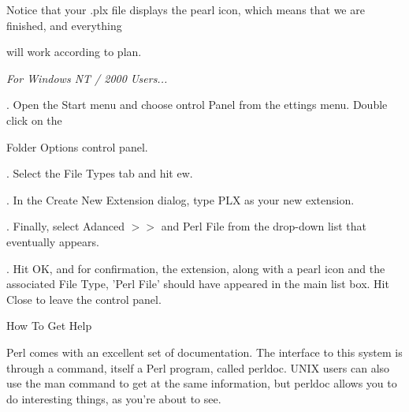 \documentclass[a4paper,11pt]{book}
\begin{document}
\noindent 

\noindent 

\noindent 

\noindent 

\noindent 

\noindent 

\noindent 

\noindent 

\noindent 

\noindent 

\noindent Notice that your .plx file displays the pearl icon, which means that we are finished, and everything

\noindent will work according to plan.

\noindent 

\noindent \textit{For Windows NT / 2000 Users...}

.   Open the Start menu and choose ontrol Panel from the ettings menu. Double click on the

\noindent Folder Options control panel.

\noindent 

.   Select the File Types tab and hit ew.

\noindent 

.   In the Create New Extension dialog, type PLX as your new extension.

\noindent 

.   Finally, select Adanced $>$$>$ and Perl File from the drop-down list that eventually appears.

\noindent 

.   Hit  OK,  and for  confirmation,  the  extension,  along  with  a  pearl  icon  and the  associated File Type,  'Perl File'  should have  appeared  in  the  main  list  box.  Hit  Close to  leave  the control panel.

\noindent 

\noindent How To Get Help

\noindent 

\noindent Perl comes with an excellent set of documentation. The interface to this system is through a command, itself a Perl program, called perldoc. UNIX users can also use the man command to get at the same information, but perldoc allows you to do interesting things, as you're about to see.

\noindent 

\noindent 
\end{document}
